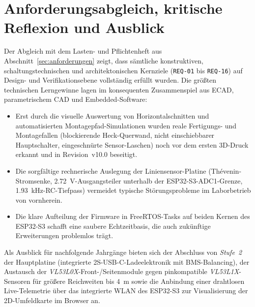 \section{Anforderungsabgleich, kritische Reflexion und Ausblick}
\label{sec:fazit}
Der Abgleich mit dem Lasten- und Pflichtenheft aus Abschnitt~\ref{sec:anforderungen} zeigt, dass sämtliche konstruktiven, schaltungstechnischen und architektonischen Kernziele (\texttt{REQ-01} bis \texttt{REQ-16}) auf Design- und Verifikationsebene vollständig erfüllt wurden. Die größten technischen Lerngewinne lagen im konsequenten Zusammenspiel aus ECAD, parametrischem CAD und Embedded-Software:
\begin{itemize}
  \item Erst durch die visuelle Auswertung von Horizontalschnitten und automatisierten Montagepfad-Simulationen wurden reale Fertigungs- und Montagefallen (blockierende Heck-Querwand, nicht einschiebbarer Hauptschalter, eingeschnürte Sensor-Laschen) noch vor dem ersten 3D-Druck erkannt und in Revision~v10.0 beseitigt.
  \item Die sorgfältige rechnerische Auslegung der Liniensensor-Platine (Thévenin-Stromsenke, \qty{2,72}{\volt}-Ausgangsteiler unterhalb der ESP32-S3-ADC1-Grenze, \qty{1,93}{\kilo\hertz}-RC-Tiefpass) vermeidet typische Störungsprobleme im Laborbetrieb von vornherein.
  \item Die klare Aufteilung der Firmware in FreeRTOS-Tasks auf beiden Kernen des ESP32-S3 schafft eine saubere Echtzeitbasis, die auch zukünftige Erweiterungen problemlos trägt.
\end{itemize}

Als Ausblick für nachfolgende Jahrgänge bieten sich der Abschluss von \emph{Stufe~2} der Hauptplatine (integrierte 2S-USB-C-Ladeelektronik mit BMS-Balancing), der Austausch der \emph{VL53L0X}-Front-/Seitenmodule gegen pinkompatible \emph{VL53L1X}-Sensoren für größere Reichweiten bis \qty{4}{\meter} sowie die Anbindung einer drahtlosen Live-Telemetrie über das integrierte WLAN des ESP32-S3 zur Visualisierung der 2D-Umfeldkarte im Browser an.
